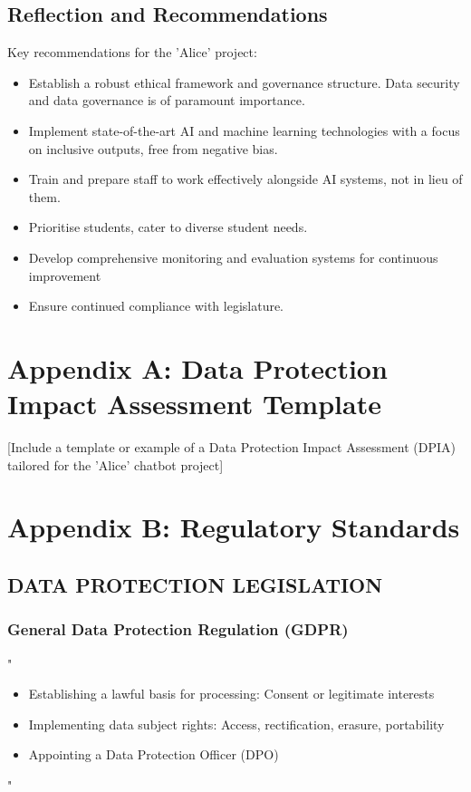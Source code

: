 \documentclass[14pt,a4paper]{article}
\begin{document}
\begin{multicols}{2}
\section{Reflection and Recommendations}

Key recommendations for the 'Alice' project:
\begin{itemize}
  \item Establish a robust ethical framework and governance structure. Data security and data governance is of paramount importance.
  \item Implement state-of-the-art AI and machine learning technologies with a focus on inclusive outputs, free from negative bias.
  \item Train and prepare staff to work effectively alongside AI systems, not in lieu of them.
  \item Prioritise students, cater to diverse student needs.
  \item Develop comprehensive monitoring and evaluation systems for continuous improvement
  \item Ensure continued compliance with legislature.
\end{itemize}



\end{multicols}

\newpage
\appendix
\section{Appendix A: Data Protection Impact Assessment Template}\label{appendix:a}
[Include a template or example of a Data Protection Impact Assessment (DPIA) tailored for the 'Alice' chatbot project]

\newpage

\section{Appendix B: Regulatory Standards}\label{appendix:b}

\subsection*{DATA PROTECTION LEGISLATION}

\subsubsection*{General Data Protection Regulation (GDPR)}
"
\begin{itemize}
    \item Establishing a lawful basis for processing: Consent or legitimate interests
    \item Implementing data subject rights: Access, rectification, erasure, portability
    \item Appointing a Data Protection Officer (DPO)
\end{itemize}
"
\end{document}
